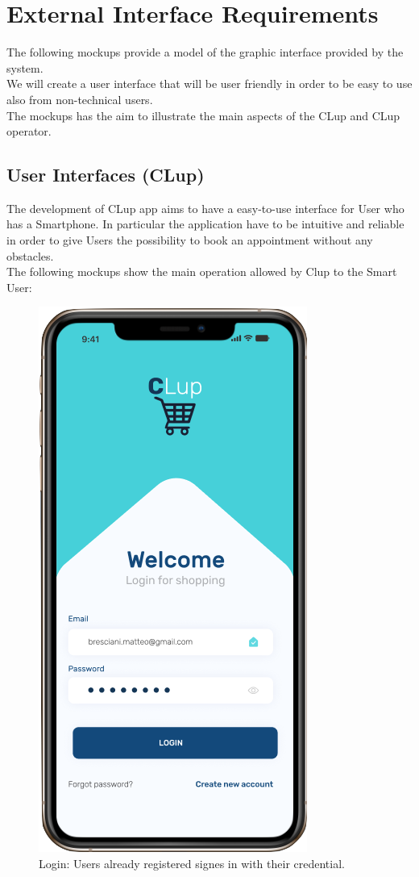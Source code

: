 \section{External Interface Requirements}
The following mockups provide a model of the graphic interface provided by the system. \\
We will create a user interface that will be user friendly in order to be easy to use also from non-technical users. \\
The mockups has the aim to illustrate the main aspects of the CLup and CLup operator.
\subsection{User Interfaces (CLup)}
The development of CLup app aims to have a easy-to-use interface for User who has a Smartphone. In particular the application have to be intuitive and reliable in order to give Users the possibility to book an appointment without any obstacles.\\
The following mockups show the main operation allowed by Clup to the Smart User:
\begin{figure}[h]
  \caption{Login: Users already registered signes in with their credential.}
  \label{fig: Login}
  \centering
  \includegraphics[scale=0.35]{images/mockup/login.png}
\end{figure}
